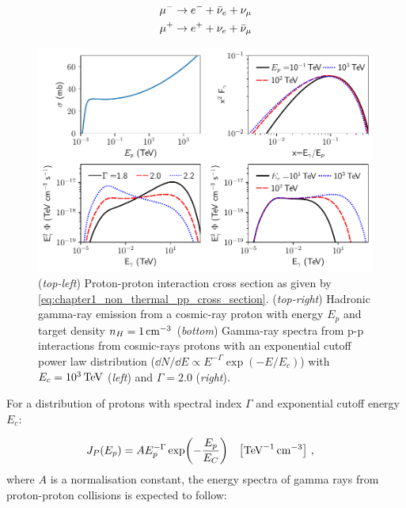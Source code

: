 \begin{equation}
    \begin{aligned}
    \muonminus &\rightarrow e^- + \bar{\nu}_e+\nu_\mu \\
    \muonplus &\rightarrow e^+ + \nu_e + \bar{\nu}_\mu
    \end{aligned}
\end{equation}
\begin{figure}[h!]
    \centering
    \includegraphics[width=\textwidth]{04_Introduction/Images/non_thermal_emission/hadronic_interaction.pdf}
    \caption{(\textit{top-left}) Proton-proton interaction cross section as given by \autoref{eq:chapter1_non_thermal_pp_cross_section}. (\textit{top-right}) Hadronic gamma-ray emission from a cosmic-ray proton with energy $E_p$ and target density $n_H=1\,\si{\per\centi\meter\cubed}$ (\textit{bottom}) Gamma-ray spectra from p-p interactions from cosmic-rays protons with an exponential cutoff power law distribution ($\dd{N}/\dd{E}\propto E^{-\Gamma}\exp(-E/E_c)$) with $E_c=10^3\,\TeV$ (\textit{left}) and $\Gamma=2.0$ (\textit{right}).}
    \label{fig:chapter_1_non_thermal_hadronic_emission}
\end{figure}
\newpar
For a distribution of protons with spectral index $\Gamma$ and exponential cutoff energy $E_c$:

\begin{equation}
    \begin{aligned}
    J_P\qty(E_p) &= A E_p^{-\Gamma} \exp(-\frac{E_p}{E_C})\quad\qty[\si{\per\tera\electronvolt\per\centi\meter\cubed}]\text{ ,}
    \end{aligned}
\end{equation}
\noindent where $A$ is a normalisation constant, the energy spectra of gamma rays from proton-proton collisions is expected to follow:

